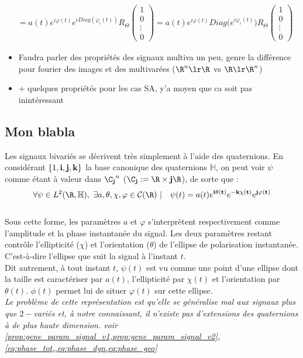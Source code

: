 \begin{remarque}
\begin{align*}
		&= a(t)e^{i\varphi(t)}e^{iDiag(\varphi_i(t))} R_\Theta\begin{pmatrix} 1 \\ 0 \\ \vdots \\ 0 \end{pmatrix} = a(t)e^{i\varphi(t)}Diag\big(e^{i\varphi_i(t)}\big) R_\Theta\begin{pmatrix} 1 \\ 0 \\ \vdots \\ 0 \end{pmatrix}
	\end{align*}
\end{remarque}

\begin{itemize}
	
	\item Faudra parler des propriétés des signaux multiva un peu, genre la différence pour fourier des images et des multivarées ($\R^n\lr\R$ vs $\R\lr\R^n$)
	
	\item + quelques propriétés pour les cas SA, y'a moyen que ca soit pas inintéressant
\end{itemize}



\subsection{Mon blabla}\label{subsec:blabla}


\begin{proposition}\label{prop:quatern}
Les signaux bivariés se décrivent très simplement à l'aide des quaternions. En considérant $\{1, \bf{i},\bf{j},\bf{k}\}$ la base canonique des quaternions $\mathbb{H}$, on peut voir $\psi$ comme étant à valeur dans ${\C_{\bf{j}}}^n$ ($\C_{\bf{j}} :=\R\times \bf{j}\R$), de sorte que :
\[\forall \psi\in L^2(\R,\mathbb{H}),\ \exists a,\theta,\chi,\varphi \in\mathcal{C}(\R)\ |\quad \psi(t) = a(t)e^{\bf{i}\theta(t)}e^{-\bf{k}\chi(t)}e^{\bf{j}\varphi(t)}\]
\\
Sous cette forme, les paramètres $a$ et $\varphi$ s'interprètent respectivement comme l'amplitude et la phase instantanée du signal. Les deux paramètres restant contrôle l'ellipticité ($\chi$) et l'orientation ($\theta$) de l’ellipse de polarisation instantanée. C'est-à-dire l'ellipse que suit la signal à l'instant $t$.
\\
Dit autrement, à tout instant $t$, $\psi(t)$ est vu comme une point d'une ellipse dont la taille est caractériser par $a(t)$, l'ellipticité par $\chi(t)$ et l'orientation par $\theta(t)$. $\phi(t)$ permet lui de situer $\varphi(t)$ sur cette ellipse.
\\

\textit{Le problème de cette représentation est qu'elle se généralise mal aux signaux plus que $2-$variés et, à notre connaissant, il n'existe pas d'extensions des quaternions à de plus haute dimension. voir \cref{prop:gene_param_signal_v1,prop:gene_param_signal_v2}, \cref{eq:phase_tot,,eq:phase_dyn,eq:phase_geo}} 
\end{proposition}

